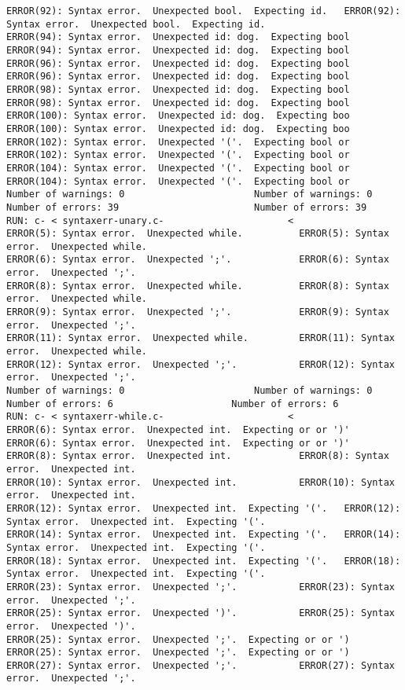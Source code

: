 \documentclass[12pt]{book}
\begin{document}
\begin{lstlisting}
ERROR(92): Syntax error.  Unexpected bool.  Expecting id.	ERROR(92): Syntax error.  Unexpected bool.  Expecting id.
ERROR(94): Syntax error.  Unexpected id: dog.  Expecting bool	ERROR(94): Syntax error.  Unexpected id: dog.  Expecting bool
ERROR(96): Syntax error.  Unexpected id: dog.  Expecting bool	ERROR(96): Syntax error.  Unexpected id: dog.  Expecting bool
ERROR(98): Syntax error.  Unexpected id: dog.  Expecting bool	ERROR(98): Syntax error.  Unexpected id: dog.  Expecting bool
ERROR(100): Syntax error.  Unexpected id: dog.  Expecting boo	ERROR(100): Syntax error.  Unexpected id: dog.  Expecting boo
ERROR(102): Syntax error.  Unexpected '('.  Expecting bool or	ERROR(102): Syntax error.  Unexpected '('.  Expecting bool or
ERROR(104): Syntax error.  Unexpected '('.  Expecting bool or	ERROR(104): Syntax error.  Unexpected '('.  Expecting bool or
Number of warnings: 0						Number of warnings: 0
Number of errors: 39						Number of errors: 39
RUN: c- < syntaxerr-unary.c-				      <
ERROR(5): Syntax error.  Unexpected while.			ERROR(5): Syntax error.  Unexpected while.
ERROR(6): Syntax error.  Unexpected ';'.			ERROR(6): Syntax error.  Unexpected ';'.
ERROR(8): Syntax error.  Unexpected while.			ERROR(8): Syntax error.  Unexpected while.
ERROR(9): Syntax error.  Unexpected ';'.			ERROR(9): Syntax error.  Unexpected ';'.
ERROR(11): Syntax error.  Unexpected while.			ERROR(11): Syntax error.  Unexpected while.
ERROR(12): Syntax error.  Unexpected ';'.			ERROR(12): Syntax error.  Unexpected ';'.
Number of warnings: 0						Number of warnings: 0
Number of errors: 6						Number of errors: 6
RUN: c- < syntaxerr-while.c-				      <
ERROR(6): Syntax error.  Unexpected int.  Expecting or or ')'	ERROR(6): Syntax error.  Unexpected int.  Expecting or or ')'
ERROR(8): Syntax error.  Unexpected int.			ERROR(8): Syntax error.  Unexpected int.
ERROR(10): Syntax error.  Unexpected int.			ERROR(10): Syntax error.  Unexpected int.
ERROR(12): Syntax error.  Unexpected int.  Expecting '('.	ERROR(12): Syntax error.  Unexpected int.  Expecting '('.
ERROR(14): Syntax error.  Unexpected int.  Expecting '('.	ERROR(14): Syntax error.  Unexpected int.  Expecting '('.
ERROR(18): Syntax error.  Unexpected int.  Expecting '('.	ERROR(18): Syntax error.  Unexpected int.  Expecting '('.
ERROR(23): Syntax error.  Unexpected ';'.			ERROR(23): Syntax error.  Unexpected ';'.
ERROR(25): Syntax error.  Unexpected ')'.			ERROR(25): Syntax error.  Unexpected ')'.
ERROR(25): Syntax error.  Unexpected ';'.  Expecting or or ')	ERROR(25): Syntax error.  Unexpected ';'.  Expecting or or ')
ERROR(27): Syntax error.  Unexpected ';'.			ERROR(27): Syntax error.  Unexpected ';'.

\end{lstlisting}
\end{document}
